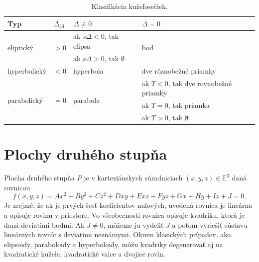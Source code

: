 
\begin{table}[h]
\centering
\begin{tabular}{|l|l|l|l|}
\hline
\textbf{Typ} & $\Delta_{33}$ & $\Delta \neq  0$ & $\Delta = 0 $ \\
\hline
\multirow{2}{*}{eliptický} & \multirow{2}{*}{$> 0$} & ak $s\Delta < 0$, tak elipsa & \multirow{2}{*}{bod} \\
& & ak $s\Delta > 0$, tak $\emptyset$ & \\
\hline
hyperbolický & $< 0$ & hyperbola & dve rôznobežné priamky \\
\hline
\multirow{3}{*}{parabolický} & \multirow{3}{*}{$= 0$} & \multirow{3}{*}{parabola} & ak $T < 0$, tak dve rovnobežné priamky \\
& & & ak $T = 0$, tak priamka \\
& & & ak $T > 0$, tak $\emptyset$ \\
\hline
\end{tabular}
\caption{Klasifikácia kužeľosečiek.}
\label{tab:conic_sections}
\end{table}

\section{Plochy druhého stupňa}
Plocha druhého stupňa $P$ je v karteziánskych súradniciach $(x, y, z) \in \mathbb{E}^3$ daná rovnicou
\[ f(x, y, z) = Ax^2 + By^2 + Cz^2 + Dxy + Exz + Fyz + Gx + Hy + Iz + J = 0. \]
Je zrejmé, že ak je prvých šesť koeficientov nulových, uvedená rovnica je lineárna a opisuje rovinu v priestore. Vo všeobecnosti rovnica opisuje kvadriku, ktorá je daná deviatimi bodmi. Ak $J \neq 0$, môžeme ju vydeliť $J$ a potom vyriešiť sústavu lineárnych rovníc s deviatimi neznámymi. Okrem klasických prípadov, ako elipsoidy, paraboloidy a hyperboloidy, môžu kvadriky degenerovať aj na kvadratické kužele, kvadratické valce a dvojice rovín.

